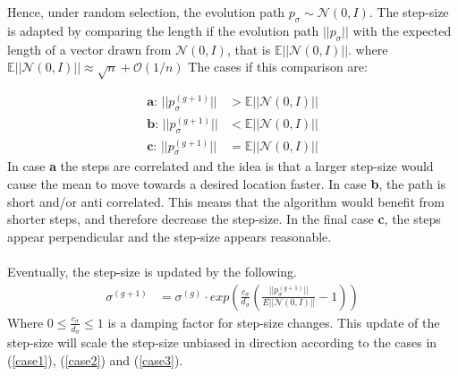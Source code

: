 Hence, under random selection, the evolution path $p_\sigma \sim \mathcal{N} 
\left( 0, I \right)$.  The step-size is adapted by comparing the length
if the evolution path $||p_\sigma||$ with the expected length of a vector 
drawn from $\mathcal{N} \left( 0, I \right)$, that is
$\mathbb{E}||\mathcal{N}\left(0, I\right)||$. where 
$\mathbb{E}||\mathcal{N}\left(0, I\right)|| \approx \sqrt{n} + \mathcal{O}\left(1/n\right)$
The cases if this comparison are:

\begin{align}
\textbf{a: } ||p_\sigma^{(g+1)}|| &> \mathbb{E}||\mathcal{N}\left(0, I\right)|| 
\label{case1}\\
\textbf{b: } ||p_\sigma^{(g+1)}|| &< \mathbb{E}||\mathcal{N}\left(0, I\right)||
\label{case2}\\
\textbf{c: } ||p_\sigma^{(g+1)}|| &= \mathbb{E}||\mathcal{N}\left(0, I\right)||\label{case3}
\end{align}
In case \textbf{a} the steps are correlated and the idea is that a larger step-size
would cause the mean to move towards a desired location faster. In case \textbf{b},
the path is short and/or anti correlated. This means that the algorithm would benefit from
shorter steps, and therefore decrease the step-size. In the final case \textbf{c}, the 
steps appear perpendicular and the step-size appears reasonable.\\
\\
Eventually, the step-size is updated by the following.
\begin{align}
\sigma^{(g+1)} &= \sigma^{(g)} \cdot exp \left( \frac{c_{\sigma}}{d_{\sigma}} \left( \frac{||p_\sigma^{(g+1)}||}{E|| \mathcal{N}(0, I) ||} - 1 \right) \right)
\end{align}
Where $0 \leq \frac{c_\sigma}{d_\sigma} \leq 1$ is a damping factor for step-size changes.
This update of the step-size will scale the step-size unbiased in direction 
according to the cases in 
(\ref{case1}), (\ref{case2}) and (\ref{case3}).










